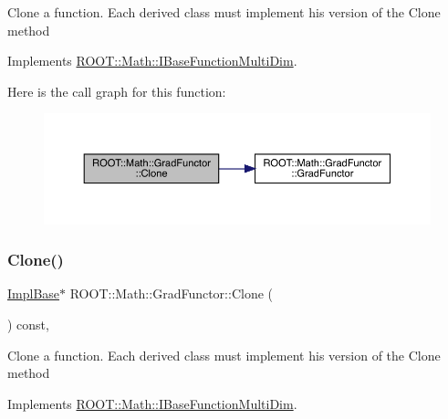 Clone a function. Each derived class must implement his version of the Clone method 

Implements \mbox{\hyperlink{classROOT_1_1Math_1_1IBaseFunctionMultiDim_a57939204b1f525b43835b42e0635dd3b}{R\+O\+O\+T\+::\+Math\+::\+I\+Base\+Function\+Multi\+Dim}}.

Here is the call graph for this function\+:
\nopagebreak
\begin{figure}[H]
\begin{center}
\leavevmode
\includegraphics[width=350pt]{de/d74/classROOT_1_1Math_1_1GradFunctor_a21093c0d3001069e49ce6278b5a32a40_cgraph}
\end{center}
\end{figure}
\mbox{\label{classROOT_1_1Math_1_1GradFunctor_a21093c0d3001069e49ce6278b5a32a40}} 
\subsubsection{\texorpdfstring{Clone()}{Clone()}\hspace{0.1cm}{\footnotesize\ttfamily [3/3]}}
{\footnotesize\ttfamily \mbox{\hyperlink{classROOT_1_1Math_1_1GradFunctor_a1fb9161fc93c7e7fa185dddbcc2c4f4d}{Impl\+Base}}$\ast$ R\+O\+O\+T\+::\+Math\+::\+Grad\+Functor\+::\+Clone (\begin{DoxyParamCaption}{ }\end{DoxyParamCaption}) const\hspace{0.3cm}{\ttfamily [inline]}, {\ttfamily [virtual]}}

Clone a function. Each derived class must implement his version of the Clone method 

Implements \mbox{\hyperlink{classROOT_1_1Math_1_1IBaseFunctionMultiDim_a57939204b1f525b43835b42e0635dd3b}{R\+O\+O\+T\+::\+Math\+::\+I\+Base\+Function\+Multi\+Dim}}.

